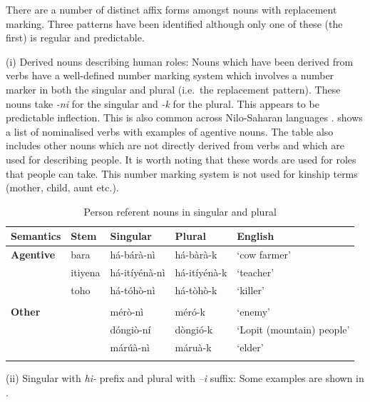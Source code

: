 \documentclass[output=paper]{langsci/langscibook}
\begin{document}
There are a number of distinct affix forms amongst nouns with replacement marking. Three patterns have been identified although only one of these (the first) is regular and predictable.

(i) Derived nouns describing human roles: Nouns which have been derived from verbs have a well-defined number marking system which involves a number marker in both the singular and plural (i.e.\ the replacement pattern). These nouns take \textit{{}-ni }for the singular and \textit{-k} for the plural. This appears to be predictable inflection. This is also common across Nilo-Saharan languages \citep[243]{Dimmendaal2000}.  shows a list of nominalised verbs with examples of agentive nouns. The table also includes other nouns which are not directly derived from verbs and which are used for describing people. It is worth noting that these words are used for roles that people can take. This number marking system is not used for kinship terms (mother, child, aunt etc.). 

\begin{table}
\begin{tabularx}{\textwidth}{XXXXX}
\lsptoprule

 \textbf{Semantics} & \textbf{Stem} & \textbf{Singular} & \textbf{Plural} & \textbf{English}\\ \midrule
\mdseries \textbf{Agentive} &  bara &  h\'{a}-b\'{a}r\`{a}-n\`{i} &  h\'{a}-b\`{a}r\`{a}-k & ‘cow farmer’\\
&  itiyena &  h\'{a}-it\'{i}y\'{e}n\`{a}-n\`{i} &  h\'{a}-it\'{i}y\'{e}n\`{a}-k & ‘teacher’\\
&  toho &  h\'{a}-t\'{o}h\`{o}-n\`{i} &  há-tòhò-k & ‘killer’\\
&  &  &  & \\
\mdseries \textbf{Other} &  &  m\'{e}r\`{o}-n\`{i} &  m\'{e}r\'{o}-k & ‘enemy’\\
&  &  d\'{o}ngi\`{o}-n\'{i} &  d\`{o}ngi\'{o}-k & ‘Lopit (mountain) people’\\
&  &  m\'{a}r\'{u}\`{a}-n\`{i} &  m\'{a}ru\`{a}-k & ‘elder’\\
\lspbottomrule
\end{tabularx}
\caption{Person referent nouns in singular and plural}
\label{tab:moodie:14}
\end{table}

(ii) Singular with \textit{hi-} prefix and plural with \textit{–i} suffix: Some examples are shown in . 
\end{document}
